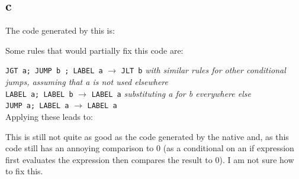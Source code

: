 \subsection{c}

The code generated by this is:


Some rules that would partially fix this code are:

\texttt{JGT a; JUMP b ; LABEL a} $\rightarrow$ \texttt{JLT b} \textit{with similar rules for other conditional jumps, assuming that a is not used elsewhere} \\
\texttt{LABEL a; LABEL b} $\rightarrow$ \texttt{LABEL a} \textit{substituting a for b everywhere else} \\
\texttt{JUMP a; LABEL a} $\rightarrow$ \texttt{LABEL a} \\

Applying these leads to:


This is still not quite as good as the code generated by the native and, as this code still has an annoying comparison to $0$ (as a conditional on an if expression first evaluates the expression then compares the result to $0$). I am not sure how to fix this.
